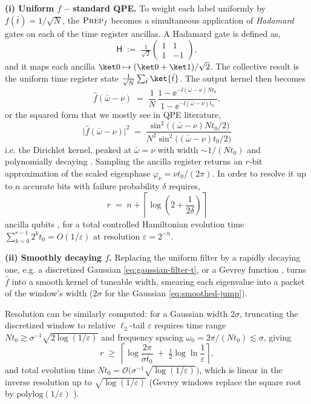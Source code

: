 \medskip 
\noindent\textbf{(i) Uniform $f$ -- standard QPE.} To weight each label uniformly by $f(\bar t) = 1/\sqrt{N}$, the $\textsc{Prep}_f$ becomes a simultaneous application of \emph{Hadamard} gates on each of the time register ancillas. A Hadamard gate is defined as, 
$$
\mathsf{H} \;:=\; \tfrac{1}{\sqrt{2}} \begin{pmatrix} 1 & 1 \\ 1 & -1 \end{pmatrix},
$$
and it maps each ancilla $\ket 0 \mapsto (\ket 0 + \ket 1)/\sqrt 2$. The collective result is the uniform time register state $\frac{1}{\sqrt N}\sum_{\bar t}\ket{\bar t}$. The output kernel then becomes
\begin{equation}
    \hat f(\bar\omega - \nu) \;=\; \frac{1}{N}\,\frac{1 - \ee^{-\ii(\bar\omega-\nu)Nt_0}}{1 - \ee^{-\ii(\bar\omega-\nu)t_0}},
\end{equation}
or the squared form that we mostly see in QPE literature, 
\begin{equation} \label{eq:QPE-prob-kernel}
    \bigl|\hat f(\bar\omega-\nu)\bigr|^2 \;=\; \frac{\sin^2\!\bigl((\bar\omega-\nu)Nt_0/2\bigr)}{N^2\sin^2\!\bigl((\bar\omega-\nu)t_0/2\bigr)}
\end{equation}
i.e. the Dirichlet kernel, peaked at $\bar{\omega} = \nu$ with width $\sim 1 / (Nt_0)$ and polynomially decaying \cite[Fig. 8]{chen2023quantum}. Sampling the ancilla register returns an $r$-bit approximation of the scaled eigenphase $\varphi_\nu = \nu t_0/(2\pi)$. In order to resolve it up to $n$ accurate bits with failure probability $\delta$ requires, 
\begin{equation} \label{eq:qpe-ancilla-count}
    r \;=\; n + \left\lceil \log\!\left(2 + \frac{1}{2\delta}\right) \right\rceil
\end{equation}
ancilla qubits \cite[Sec.~5.2.1]{bible}, for a total controlled Hamiltonian evolution time $\sum_{k=0}^{r-1} 2^k t_0 = O(1/\varepsilon)$ at resolution $\varepsilon = 2^{-n}$.

\medskip
\noindent\textbf{(ii) Smoothly decaying $f$.} Replacing the uniform filter by a rapidly decaying one, e.g. a discretized Gaussian \eqref{eq:gaussian-filter-t}, or a Gevrey function \cite[text]{ding2025efficient}, turns $\hat{f}$ into a smooth kernel of tuneable width, smearing each eigenvalue into a packet of the window's width ($2\sigma$ for the Gaussian \eqref{eq:smoothed-jump}).

Resolution can be similarly computed: for a Gaussian width $2\sigma$, truncating the discretized window to relative $\ell_2$-tail $\varepsilon$ requires time range $Nt_0 \gtrsim \sigma^{-1}\sqrt{2\log(1/\varepsilon)}$ and frequency spacing $\omega_0 = 2\pi/(Nt_0) \lesssim \sigma$, giving
\begin{equation} \label{eq:gaussian-ancilla-count}
    r \;\geq\; \left\lceil \log\!\frac{2\pi}{\sigma t_0} \;+\; \tfrac{1}{2}\log\ln\frac{1}{\varepsilon} \right\rceil,
\end{equation}
and total evolution time $Nt_0 = \mathcal{O}\!\bigl(\sigma^{-1}\sqrt{\log(1/\varepsilon)}\bigr)$, which is linear in the inverse resolution up to $\sqrt{\log(1/\varepsilon)}$ (Gevrey windows replace the square root by $\mathrm{polylog}(1/\varepsilon)$ \cite[text]{ding2025efficient}).

